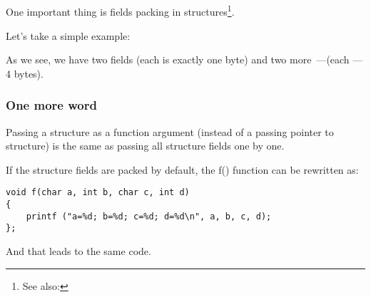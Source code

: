 \subsection{\StructurePackingSectionName}
\label{structure_packing}

One important thing is fields packing in structures\footnote{See also: \URLWPDA}.

Let's take a simple example:



As we see, we have two \Tchar fields (each is exactly one byte) and two more~---\Tint (each --- 4 bytes).





\subsubsection{One more word}

Passing a structure as a function argument (instead of a passing pointer to structure) is the same
as passing all structure fields one by one.

If the structure fields are packed by default, the f() function can be rewritten as:

\begin{lstlisting}[style=customc]
void f(char a, int b, char c, int d)
{
    printf ("a=%d; b=%d; c=%d; d=%d\n", a, b, c, d);
};
\end{lstlisting}

And that leads to the same code.
